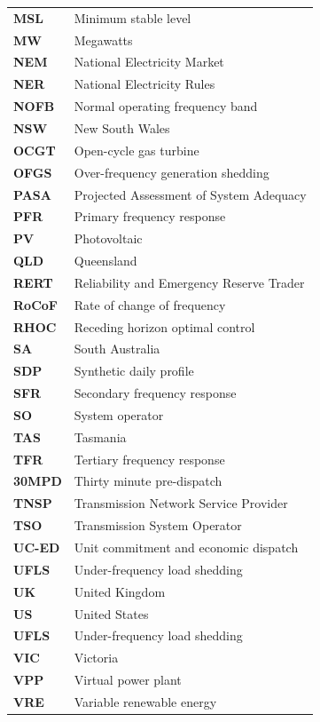 \documentclass[12pt,a4paper,]{report}
\begin{document}
\begin{longtable}[l]{l l}
\textbf{MSL} & Minimum stable level \\
\textbf{MW} & Megawatts \\
\textbf{NEM} & National Electricity Market \\
\textbf{NER} & National Electricity Rules \\
\textbf{NOFB} & Normal operating frequency band \\
\textbf{NSW} & New South Wales \\
\textbf{OCGT} & Open-cycle gas turbine \\
\textbf{OFGS} & Over-frequency generation shedding \\
\textbf{PASA} & Projected Assessment of System Adequacy \\
\textbf{PFR} & Primary frequency response \\
\textbf{PV} & Photovoltaic \\
\textbf{QLD} & Queensland \\
\textbf{RERT} & Reliability and Emergency Reserve Trader \\
\textbf{RoCoF} & Rate of change of frequency \\
\textbf{RHOC} & Receding horizon optimal control \\
\textbf{SA} &  South Australia \\
\textbf{SDP} & Synthetic daily profile \\
\textbf{SFR} & Secondary frequency response \\
\textbf{SO} & System operator \\
\textbf{TAS} & Tasmania \\
\textbf{TFR} & Tertiary frequency response \\
\textbf{30MPD} & Thirty minute pre-dispatch \\
\textbf{TNSP} & Transmission Network Service Provider \\
\textbf{TSO} & Transmission System Operator \\
\textbf{UC-ED} & Unit commitment and economic dispatch \\
\textbf{UFLS} & Under-frequency load shedding \\
\textbf{UK} & United Kingdom \\
\textbf{US} & United States \\
\textbf{UFLS} & Under-frequency load shedding \\
\textbf{VIC} & Victoria \\
\textbf{VPP} & Virtual power plant \\
\textbf{VRE} & Variable renewable energy \\
\end{longtable}
\end{document}
